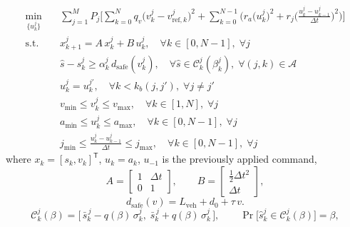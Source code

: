 \documentclass[letterpaper, 10 pt, journal]{IEEEtran}
\begin{document}
\begin{subequations} \label{eq:mpc_problem}
\begin{align}
    \min_{\{u^j_k\}} \quad
    & \sum_{j=1}^{M} P_j
      \Bigg[
        \sum_{k=0}^{N} q_v \big(v^j_k - v^j_{\mathrm{ref},k}\big)^2
        + \sum_{k=0}^{N-1} \bigg(
            r_a \big(u^j_k\big)^2
            + r_j \bigg(\frac{u^j_k - u^j_{k-1}}{\Delta t}\bigg)^2
          \bigg)
      \Bigg]
      \label{eq:cost} \\
    \textrm{s.t.} \quad
    & x^j_{k+1} = A\,x^j_k + B\,u^j_k,
      \quad \forall k \in [0, N-1],\; \forall j
      \label{eq:dynamics} \\
    & \hat s - s^j_k \ge \alpha^j_k\, d_{\mathrm{safe}}(v^j_k),
      \quad \forall \hat s \in \mathcal{C}^j_k(\beta^j_k),
      \; \forall (j,k) \in \mathcal{A}
      \label{eq:safety} \\
    & u^j_k = u^{j'}_k,
      \quad \forall k < k_b(j,j'), \;
      \forall j \neq j'
      \label{eq:branch_nac} \\
    & v_{\min} \le v^j_k \le v_{\max},
      \quad \forall k \in [1, N], \; \forall j
      \label{eq:state_bound} \\
    & a_{\min} \le u^j_k \le a_{\max},
      \quad \forall k \in [0, N-1], \; \forall j
      \label{eq:input_bound} \\
    & j_{\min} \le \frac{u^j_k - u^j_{k-1}}{\Delta t} \le j_{\max},
      \quad \forall k \in [0, N-1], \; \forall j
      \label{eq:jerk_bound}
\end{align}
\end{subequations}
where $x_k = [s_k, v_k]^\mathsf{T}$, $u_k = a_k$, $u_{-1}$ is the previously applied command,
\begin{equation}
    A = \begin{bmatrix} 1 & \Delta t \\ 0 & 1 \end{bmatrix}, \qquad
    B = \begin{bmatrix} \tfrac{1}{2}\Delta t^2 \\ \Delta t \end{bmatrix},
    \label{eq:ab}
\end{equation}
\begin{equation}
    d_{\mathrm{safe}}(v) = L_{\mathrm{veh}} + d_0 + \tau\, v .
    \label{eq:dsafe}
\end{equation}
\begin{equation}
    \mathcal{C}^j_k(\beta) = \big[\, \bar s^{\,j}_k - q(\beta)\,\sigma^j_k,\;
                                  \bar s^{\,j}_k + q(\beta)\,\sigma^j_k \,\big],
    \qquad \Pr\big[\hat s^j_k \in \mathcal{C}^j_k(\beta)\big] = \beta,
    \label{eq:conf_set}
\end{equation}
\end{document}
